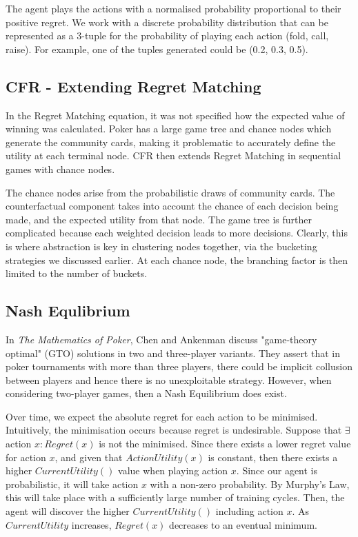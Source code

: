 \documentclass{article}
\begin{document}
The agent plays the actions with a normalised probability proportional to their positive regret. We work with a discrete probability distribution that can be represented as a 3-tuple for the probability of playing each action (fold, call, raise). For example, one of the tuples generated could be (0.2, 0.3, 0.5).

\subsection{CFR - Extending Regret Matching}

In the Regret Matching equation, it was not specified how the expected value of winning was calculated. Poker has a large game tree and chance nodes which generate the community cards, making it problematic to accurately define the utility at each terminal node. CFR then extends Regret Matching in sequential games with chance nodes.

The chance nodes arise from the probabilistic draws of community cards. The counterfactual component takes into account the chance of each decision being made, and the expected utility from that node. The game tree is further complicated because each weighted decision leads to more decisions. Clearly, this is where abstraction is key in clustering nodes together, via the bucketing strategies we discussed earlier. At each chance node, the branching factor is then limited to the number of buckets.

\subsection{Nash Equlibrium}

In \textit{The Mathematics of Poker}, Chen and Ankenman discuss "game-theory optimal" (GTO) solutions in two and three-player variants. They assert that in poker tournaments with more than three players, there could be implicit collusion between players and hence there is no unexploitable strategy. However, when considering two-player games, then a Nash Equilibrium does exist. 

Over time, we expect the absolute regret for each action to be minimised. Intuitively, the minimisation occurs because regret is undesirable. Suppose that $\exists$ action $x : Regret(x)$ is not the minimised. Since there exists a lower regret value for action $x$, and given that $ActionUtility(x)$ is constant, then there exists a higher $CurrentUtility()$ value when playing action $x$. Since our agent is probabilistic, it will take action $x$ with a non-zero probability. By Murphy's Law, this will take place with a  sufficiently large number of training cycles. Then, the agent will discover the higher $CurrentUtility()$ including action $x$. As $CurrentUtility$ increases, $Regret(x)$ decreases to an eventual minimum.
\end{document}
